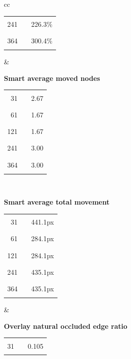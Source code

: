 \begin{center}
\begin{figure}[htbp]
\begin{tabular}{cc}
\begin{minipage}[t]{0.46\textwidth}
\begin{tabular}{@{}r l r@{}}
241 & \textcolor{blue!70!black}{\rule{0.1507\textwidth}{1.1ex}} & 226.3\% \\
364 & \textcolor{blue!70!black}{\rule{0.2000\textwidth}{1.1ex}} & 300.4\% \\
\end{tabular}
\end{minipage}
&
\begin{minipage}[t]{0.46\textwidth}
\centering
\textbf{Smart average moved nodes}\\[-0.2em]
\begin{tabular}{@{}r l r@{}}
31 & \textcolor{blue!70!black}{\rule{0.1780\textwidth}{1.1ex}} & 2.67 \\
61 & \textcolor{blue!70!black}{\rule{0.1113\textwidth}{1.1ex}} & 1.67 \\
121 & \textcolor{blue!70!black}{\rule{0.1113\textwidth}{1.1ex}} & 1.67 \\
241 & \textcolor{blue!70!black}{\rule{0.2000\textwidth}{1.1ex}} & 3.00 \\
364 & \textcolor{blue!70!black}{\rule{0.2000\textwidth}{1.1ex}} & 3.00 \\
\end{tabular}
\end{minipage} \\[1.2em]
\begin{minipage}[t]{0.46\textwidth}
\centering
\textbf{Smart average total movement}\\[-0.2em]
\begin{tabular}{@{}r l r@{}}
31 & \textcolor{blue!70!black}{\rule{0.2000\textwidth}{1.1ex}} & 441.1px \\
61 & \textcolor{blue!70!black}{\rule{0.1288\textwidth}{1.1ex}} & 284.1px \\
121 & \textcolor{blue!70!black}{\rule{0.1288\textwidth}{1.1ex}} & 284.1px \\
241 & \textcolor{blue!70!black}{\rule{0.1973\textwidth}{1.1ex}} & 435.1px \\
364 & \textcolor{blue!70!black}{\rule{0.1973\textwidth}{1.1ex}} & 435.1px \\
\end{tabular}
\end{minipage}
&
\begin{minipage}[t]{0.46\textwidth}
\centering
\textbf{Overlay natural occluded edge ratio}\\[-0.2em]
\begin{tabular}{@{}r l r@{}}
31 & \textcolor{blue!70!black}{\rule{0.0572\textwidth}{1.1ex}} & 0.105 \\

\end{tabular}
\end{minipage}
\end{tabular}
\end{figure}
\end{center}
